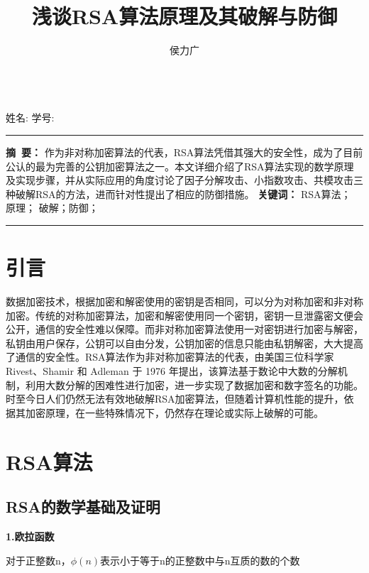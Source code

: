\documentclass[a4paper,12pt]{article}
\title{浅谈RSA算法原理及其破解与防御}
\author{侯力广}
\makeatletter
\newcommand{\upcite}[1]{\textsuperscript{\textsuperscript{\cite{#1}}}}
\renewcommand\maketitle{
{\raggedright
\vspace*{12pt}
\begin{center}
{\fontsize{20pt}{20pt}\selectfont \bfseries \@title }\\[1.5em]
  姓名: \@author \quad 学号: \defstunum \\
\end{center}}
}
\makeatother
\begin{document}
\maketitle

\noindent\rule[0.1\baselineskip]{\textwidth}{0.5pt}
\textbf{摘~要：} 作为非对称加密算法的代表，RSA算法凭借其强大的安全性，成为了目前公认的最为完善的公钥加密算法之一。本文详细介绍了RSA算法实现的数学原理及实现步骤，并从实际应用的角度讨论了因子分解攻击、小指数攻击、共模攻击三种破解RSA的方法，进而针对性提出了相应的防御措施。
\vskip 3pt
\noindent \textbf{关键词：} RSA算法；  原理； 破解；防御； \\
\rule[0.3\baselineskip]{\textwidth}{0.5pt}
\vskip 10pt







\section{引言}

数据加密技术，根据加密和解密使用的密钥是否相同，可以分为对称加密和非对称加密。传统的对称加密算法，加密和解密使用同一个密钥，密钥一旦泄露密文便会公开，通信的安全性难以保障。而非对称加密算法使用一对密钥进行加密与解密，私钥由用户保存，公钥可以自由分发，公钥加密的信息只能由私钥解密，大大提高了通信的安全性。RSA算法作为非对称加密算法的代表，由美国三位科学家 Rivest、Shamir 和 Adleman 于 1976 年提出，该算法基于数论中大数的分解机制，利用大数分解的困难性进行加密，进一步实现了数据加密和数字签名的功能。时至今日人们仍然无法有效地破解RSA加密算法，但随着计算机性能的提升，依据其加密原理，在一些特殊情况下，仍然存在理论或实际上破解的可能。\upcite{python破解}


\section{RSA算法}

\subsection{RSA的数学基础及证明}

\textbf{1.欧拉函数}\par
对于正整数n，$\phi(n)$表示小于等于n的正整数中与n互质的数的个数\par
\quad  \par 
\end{document}
